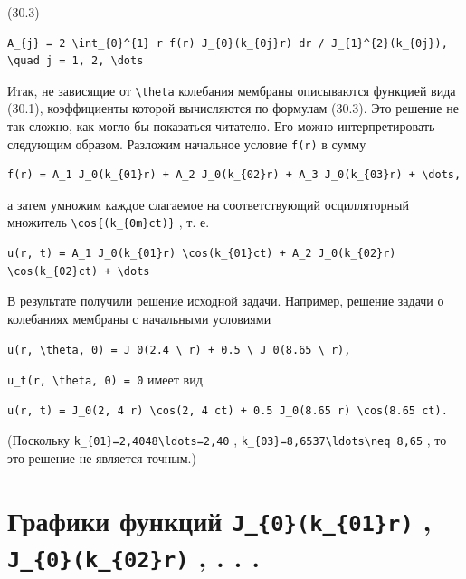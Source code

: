 \documentclass[
  ukrainian,
]{article}
\begin{document}
(30.3)

\begin{verbatim}
A_{j} = 2 \int_{0}^{1} r f(r) J_{0}(k_{0j}r) dr / J_{1}^{2}(k_{0j}), \quad j = 1, 2, \dots
\end{verbatim}

Итак, не зависящие от \texttt{\textbackslash{}theta} колебания мембраны
описываются функцией вида (30.1), коэффициенты которой вычисляются по
формулам (30.3). Это решение не так сложно, как могло бы показаться
читателю. Его можно интерпретировать следующим образом. Разложим
начальное условие \texttt{f(r)} в сумму

\begin{verbatim}
f(r) = A_1 J_0(k_{01}r) + A_2 J_0(k_{02}r) + A_3 J_0(k_{03}r) + \dots,
\end{verbatim}

а затем умножим каждое слагаемое на соответствующий осцилляторный
множитель \texttt{\textbackslash{}cos\{(k\_\{0m\}ct)\}} , т. е.

\begin{verbatim}
u(r, t) = A_1 J_0(k_{01}r) \cos(k_{01}ct) + A_2 J_0(k_{02}r) \cos(k_{02}ct) + \dots
\end{verbatim}

В результате получили решение исходной задачи. Например, решение задачи
о колебаниях мембраны с начальными условиями

\begin{verbatim}
u(r, \theta, 0) = J_0(2.4 \ r) + 0.5 \ J_0(8.65 \ r),
\end{verbatim}

\texttt{u\_t(r,\ \textbackslash{}theta,\ 0)\ =\ 0} имеет вид

\begin{verbatim}
u(r, t) = J_0(2, 4 r) \cos(2, 4 ct) + 0.5 J_0(8.65 r) \cos(8.65 ct).
\end{verbatim}

(Поскольку \texttt{k\_\{01\}=2,4048\textbackslash{}ldots=2,40} ,
\texttt{k\_\{03\}=8,6537\textbackslash{}ldots\textbackslash{}neq\ 8,65}
, то это решение не является точным.)

\section{\texorpdfstring{Графики функций \texttt{J\_\{0\}(k\_\{01\}r)} ,
\texttt{J\_\{0\}(k\_\{02\}r)} , . .
.}{Графики функций J\_\{0\}(k\_\{01\}r) , J\_\{0\}(k\_\{02\}r) , . . .}}\label{ux433ux440ux430ux444ux438ux43aux438-ux444ux443ux43dux43aux446ux438ux439-j_0k_01r-j_0k_02r-.-.-.}
\end{document}
